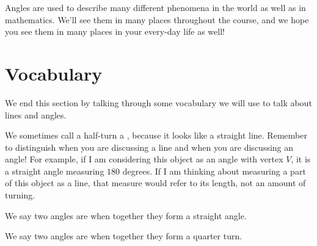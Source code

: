\documentclass{ximera}
\begin{document}
Angles are used to describe many different phenomena in the world as well as in mathematics. We'll see them in many places throughout the course, and we hope you see them in many places in your every-day life as well!

\section{Vocabulary}

We end this section by talking through some vocabulary we will use to talk about lines and angles.

We sometimes call a half-turn a , because it looks like a straight line. Remember to distinguish when you are discussing a line and when you are discussing an angle! For example, if I am considering this object as an angle with vertex $V$, it is a straight angle measuring $180$ degrees. If I am thinking about measuring a part of this object as a line, that measure would refer to its length, not an amount of turning.

\begin{image}
\end{image}

We say two angles are  when together they form a straight angle. 
\begin{image}
\end{image}

We say two angles are  when together they form a quarter turn.
\end{document}
